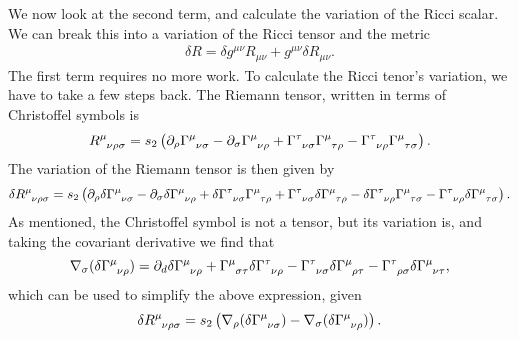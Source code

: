 We now look at the second term, and calculate the variation of the Ricci scalar. We can break this into a variation of the Ricci tensor and the metric
\begin{equation*}
	\begin{aligned}
		\delta R = \delta g^{\mu \nu} R_{\mu \nu} + g^{\mu \nu} \delta R_{\mu \nu}.
	\end{aligned}
\end{equation*} 
The first term requires no more work. To calculate the Ricci tenor's variation, we have to take a few steps back. The Riemann tensor, written in terms of Christoffel symbols is
\begin{equation*}
\begin{aligned}
		\tensor{R}{^\mu_{\nu \rho \sigma}} &= s_2 \left(\partial_\rho \tensor{\Gamma}{^\mu_{\nu \sigma}} - \partial_\sigma \tensor{\Gamma}{^\mu_{\nu \rho}} +  \tensor{\Gamma}{^\tau_{\nu \sigma}} \tensor{\Gamma}{^\mu_{\tau \rho}} -  \tensor{\Gamma}{^\tau_{\nu \rho}} \tensor{\Gamma}{^\mu_{\tau \sigma}} \right). \\
\end{aligned}
\end{equation*} 
The variation of the Riemann tensor is then given by
\begin{equation*}
	\delta \tensor{R}{^\mu_{\nu \rho \sigma}} = s_2\left(\partial_\rho \delta \tensor{\Gamma}{^\mu_{\nu \sigma}} - \partial_\sigma \delta \tensor{\Gamma}{^\mu_{\nu \rho}}	+  \delta \tensor{\Gamma}{^\tau_{\nu \sigma}} \tensor{\Gamma}{^\mu_{\tau \rho}}  +  \tensor{\Gamma}{^\tau_{\nu \sigma}} \delta \tensor{\Gamma}{^\mu_{\tau \rho}} -  \delta \tensor{\Gamma}{^\tau_{\nu \rho}} \tensor{\Gamma}{^\mu_{\tau \sigma}} - \tensor{\Gamma}{^\tau_{\nu \rho}} \delta \tensor{\Gamma}{^\mu_{\tau \sigma}}  \right).
\end{equation*} 
As mentioned, the Christoffel symbol is not a tensor, but its variation is, and taking the covariant derivative we find that
\begin{equation*}
	\nabla_\sigma (\delta \tensor{\Gamma}{^\mu_{\nu \rho}}) = \partial_ d \delta \tensor{\Gamma}{^\mu_{\nu \rho}} +  \tensor{\Gamma}{^\mu_{\sigma \tau}} \delta \tensor{\Gamma}{^\tau_{\nu \rho}} - \tensor{\Gamma}{^\tau_{\nu \sigma}}\delta \tensor{\Gamma}{^\mu_{\rho \tau}} - \tensor{\Gamma}{^\tau_{\rho \sigma}} \delta \tensor{\Gamma}{^\mu_{\nu \tau}},
\end{equation*}
which can be used to simplify the above expression, given
\begin{equation*}
	\delta \tensor{R}{^\mu_{\nu \rho \sigma}} =   s_2 \left( \nabla_\rho (\delta \tensor{\Gamma}{^\mu_{\nu \sigma}}) - \nabla_\sigma (\delta \tensor{\Gamma}{^\mu_{\nu \rho}}) \right).
\end{equation*}
